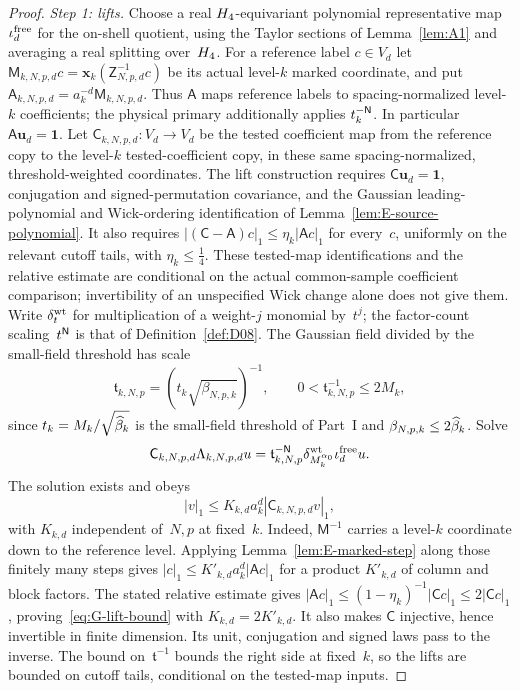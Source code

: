 \begin{proof}
\emph{Step 1: lifts.} Choose a real $H_4$-equivariant polynomial representative map $\iota_d^{\rm free}$ for the on-shell quotient, using the Taylor sections of Lemma~\ref{lem:A1} and averaging a real splitting over~$H_4$. For a reference label $c\in V_d$ let $\mathsf M_{k,N,p,d}c=\mathbf x_k(\mathsf Z_{N,p,d}^{-1}c)$ be its actual level-$k$ marked coordinate, and put $\mathsf A_{k,N,p,d}=a_k^{-d}\mathsf M_{k,N,p,d}$. Thus $\mathsf A$ maps reference labels to spacing-normalized level-$k$ coefficients; the physical primary additionally applies $t_k^{-\mathsf{N}}$. In particular $\mathsf A\mathbf u_d=\mathbf1$. Let $\mathsf C_{k,N,p,d}:V_d\to V_d$ be the tested coefficient map from the reference copy to the level-$k$ tested-coefficient copy, in these same spacing-normalized, threshold-weighted coordinates. The lift construction requires $\mathsf C\mathbf u_d=\mathbf1$, conjugation and signed-permutation covariance, and the Gaussian leading-polynomial and Wick-ordering identification of Lemma~\ref{lem:E-source-polynomial}. It also requires $|(\mathsf C-\mathsf A)c|_1\le\eta_k|\mathsf A c|_1$ for every~$c$, uniformly on the relevant cutoff tails, with $\eta_k\le\tfrac14$. These tested-map identifications and the relative estimate are conditional on the actual common-sample coefficient comparison; invertibility of an unspecified Wick change alone does not give them. Write $\delta_t^{\rm wt}$ for multiplication of a weight-$j$ monomial by~$t^j$; the factor-count scaling~$t^{\mathsf{N}}$ is that of Definition~\ref{def:D08}. The Gaussian field divided by the small-field threshold has scale
\begin{equation*}
\mathfrak t_{k,N,p}=(t_k\sqrt{\beta_{N,p,k}})^{-1},\qquad
0<\mathfrak t_{k,N,p}^{-1}\le2M_k,
\end{equation*}
since $t_k=M_k/\sqrt{\widehat{\beta}_k}$ is the small-field threshold of Part~I and $\beta_{N,p,k}\le2\widehat{\beta}_k$. Solve
\begin{equation}\label{eq:G-lift-equation}
\mathsf C_{k,N,p,d}\Lambda_{k,N,p,d}u
=\mathfrak t_{k,N,p}^{-\mathsf{N}}\delta_{M_k^{\alpha_0}}^{\rm wt}\iota_d^{\rm free}u.
\end{equation}
The solution exists and obeys
\begin{equation}\label{eq:G-lift-bound}
|v|_1\le K_{k,d}a_k^d|\mathsf C_{k,N,p,d}v|_1,
\end{equation}
with $K_{k,d}$ independent of~$N,p$ at fixed~$k$. Indeed, $\mathsf M^{-1}$ carries a level-$k$ coordinate down to the reference level. Applying Lemma~\ref{lem:E-marked-step} along those finitely many steps gives $|c|_1\le K'_{k,d}a_k^d|\mathsf A c|_1$ for a product $K'_{k,d}$ of column and block factors. The stated relative estimate gives $|\mathsf A c|_1\le(1-\eta_k)^{-1}|\mathsf C c|_1\le2|\mathsf C c|_1$, proving~\eqref{eq:G-lift-bound} with $K_{k,d}=2K'_{k,d}$. It also makes $\mathsf C$ injective, hence invertible in finite dimension. Its unit, conjugation and signed laws pass to the inverse. The bound on~$\mathfrak t^{-1}$ bounds the right side at fixed~$k$, so the lifts are bounded on cutoff tails, conditional on the tested-map inputs.


\end{proof}
